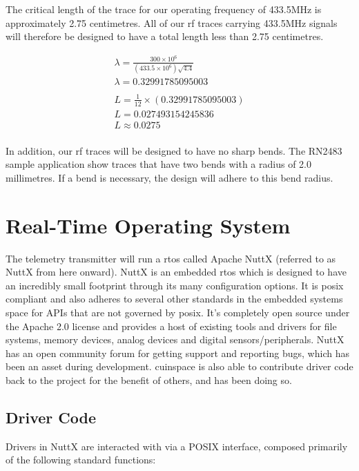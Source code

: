 The critical length of the trace for our operating frequency of 433.5MHz is approximately 2.75 centimetres. All of our
\gls{rf} traces carrying 433.5MHz signals will therefore be designed to have a total length less than 2.75 centimetres.

\begin{gather*}
    \lambda = \frac{300 \times 10^6}{(433.5 \times 10^6)\sqrt{4.4}} \\
    \lambda = 0.32991785095003 \\
    \\
    L = \frac{1}{12} \times (0.32991785095003) \\
    L = 0.027493154245836 \\
    L \approx 0.0275 \\
\end{gather*}

In addition, our \gls{rf} traces will be designed to have no sharp bends. The RN2483 sample application show traces
that have two bends with a radius of 2.0 millimetres. \cite[Sec. 5.1]{rn2483-datasheet} If a bend is necessary, the
design will adhere to this bend radius.

\section{Real-Time Operating System}

The telemetry transmitter will run a \gls{rtos} called Apache NuttX (referred to as NuttX from here onward). NuttX is
an embedded \gls{rtos} which is designed to have an incredibly small footprint through its many configuration options.
\cite{nuttx-about} It is \gls{posix} compliant and also adheres to several other standards in the embedded systems
space for APIs that are not governed by \gls{posix}. \cite{nuttx-about} It's completely open source under the Apache
2.0 license and provides a host of existing tools and drivers for file systems, memory devices, analog devices and
digital sensors/peripherals. NuttX has an open community forum for getting support and reporting bugs, which has been
an asset during development. \Gls{cuinspace} is also able to contribute driver code back to the project for the benefit
of others, and has been doing so.

\subsection{Driver Code}

Drivers in NuttX are interacted with via a POSIX interface, composed primarily of the following standard functions:

